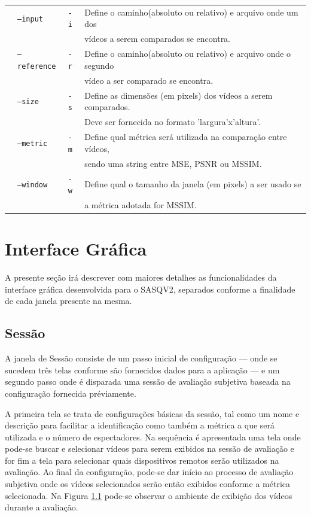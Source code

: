 \begin{table}[!h]
	\begin{tabular}{llll}
	& \texttt{--input} & \texttt{-i} & Define o caminho(absoluto ou relativo) e arquivo onde um dos \\ 
	& & & vídeos a serem comparados se encontra. \\
	& \texttt{--reference} & \texttt{-r} & Define o caminho(absoluto ou relativo) e arquivo onde o segundo \\
	& & & vídeo a ser comparado se encontra. \\
	& \texttt{--size} & \texttt{-s} & Define as dimensões (em pixels) dos vídeos a serem comparados. \\ 
	& & & Deve ser fornecida no formato 'largura'x'altura'. \\
	& \texttt{--metric} & \texttt{-m} & Define qual métrica será utilizada na comparação entre vídeos, \\
	& & & sendo uma string entre MSE, PSNR ou MSSIM. \\
	& \texttt{--window} & \texttt{-w} & Define qual o tamanho da janela (em pixels) a ser usado se \\ 
	& & & a métrica adotada for MSSIM. \\
	\end{tabular}
\end{table}

\section{Interface Gráfica}

A presente seção irá descrever com maiores detalhes as funcionalidades da interface gráfica desenvolvida para o SASQV2, separados conforme a finalidade de cada janela presente na mesma.

\subsection{Sessão}

A janela de Sessão consiste de um passo inicial de configuração --- onde se sucedem três telas conforme são fornecidos dados para a aplicação --- e um segundo passo onde é disparada uma sessão de avaliação subjetiva baseada na configuração fornecida préviamente.

A primeira tela se trata de configurações básicas da sessão, tal como um nome e descrição para facilitar a identificação como também a métrica a que será utilizada e o número de espectadores.
Na sequência é apresentada uma tela onde pode-se buscar e selecionar vídeos para serem exibidos na sessão de avaliação e for fim a tela para selecionar quais dispositivos remotos serão utilizados na avaliação. Ao final da configuração, pode-se dar início ao processo de avaliação subjetiva onde os vídeos selecionados serão então exibidos conforme a métrica selecionada.
Na Figura \ref{} pode-se observar o ambiente de exibição dos vídeos durante a avaliação.

